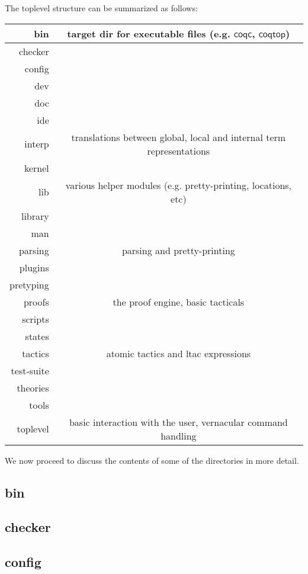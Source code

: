 \documentclass[a4paper,oneside]{book}
\newcommand{\m}[1]{\ensuremath{\mathsf{#1}}}
\begin{document}
\noindent
The toplevel structure can be summarized as follows: \\

\begin{tabular}{|r|c|}
\hline
bin & target dir for executable files (e.g. \m{coqc}, \m{coqtop}) \\ \hline
checker & \\ \hline
config & \\ \hline
dev & \\ \hline
doc & \\ \hline
ide & \\ \hline
interp & translations between global, local and internal term representations 
\\ \hline
kernel & \\ \hline
lib & various helper modules (e.g. pretty-printing, locations, etc)
\\ \hline
library & \\ \hline
man & \\ \hline
parsing & parsing and pretty-printing \\ \hline
plugins & \\ \hline
pretyping & \\ \hline
proofs & the proof engine, basic tacticals \\ \hline
scripts & \\ \hline
states & \\ \hline
tactics & atomic tactics and ltac expressions\\ \hline
test-suite & \\ \hline
theories & \\ \hline
tools & \\ \hline
toplevel & basic interaction with the user, vernacular command handling
\\ \hline
\end{tabular}

We now proceed to discuss the contents of some of the directories in
more detail.

\subsection{bin}
\subsection{checker}
\subsection{config}
\end{document}
